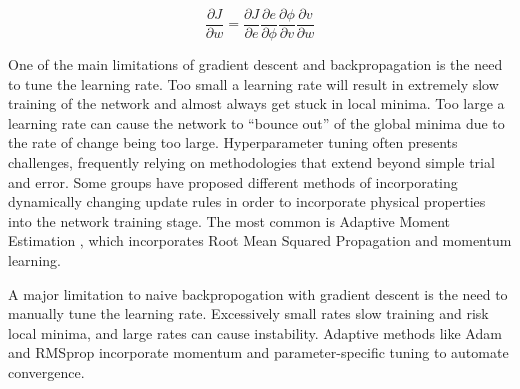 \begin{equation}
    \frac{\partial J}{\partial w} = \frac{\partial J}{\partial e}\frac{\partial e}{\partial \phi}\frac{\partial \phi}{\partial v} \frac{\partial v}{\partial w}
    \label{eq:chain-rule}
\end{equation}

One of the main limitations of gradient descent and backpropagation is the need to tune the learning rate.
Too small a learning rate will result in extremely slow training of the network and almost always get stuck in local minima.
Too large a learning rate can cause the network to ``bounce out'' of the global minima due to the rate of change being too large.
Hyperparameter tuning often presents challenges, frequently relying on methodologies that extend beyond simple trial and error.
Some groups have proposed different methods of incorporating dynamically changing update rules in order to incorporate physical properties into the network training stage.
The most common is Adaptive Moment Estimation \cite{kingmaAdamMethodStochastic2017}, which incorporates Root Mean Squared Propagation \cite{hinton2012neural} and momentum learning.

A major limitation to naive backpropogation with gradient descent is the need to manually tune the learning rate.
Excessively small rates slow training and risk local minima,  and large rates can cause instability.
Adaptive methods like Adam \cite{kingmaAdamMethodStochastic2017} and RMSprop \cite{hinton2012neural} incorporate momentum and parameter-specific tuning to automate convergence.

